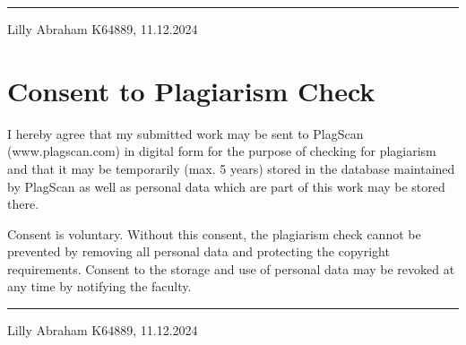 \documentclass{report} %
\begin{document}
\vspace{3cm}
\hfill\rule{15cm}{0.4pt} %

\begin{center}
    Lilly Abraham K64889, 11.12.2024 %
\end{center}

\newpage 

\chapter*{Consent to Plagiarism Check}
\vspace{1cm}

\noindent I hereby agree that my submitted work may be sent to PlagScan (www.plagscan.com) in digital form for the purpose of checking for plagiarism and that it may be temporarily (max. 5 years) stored in the database maintained by PlagScan as well as personal data which are part of this work may be stored there.

\vspace{0.5cm}

\noindent Consent is voluntary. Without this consent, the plagiarism check cannot be prevented by removing all personal data and protecting the copyright requirements. Consent to the storage and use of personal data may be revoked at any time by notifying the faculty.

\vspace{3cm}
\hfill\rule{15cm}{0.4pt} %

\begin{center}
    Lilly Abraham K64889, 11.12.2024 %
\end{center}
\end{document}
